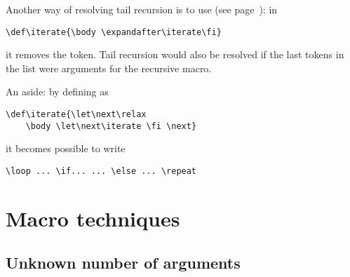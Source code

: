 Another way of resolving tail recursion is to use
 (see page~\pageref{after:cond}): in
\begin{verbatim}
\def\iterate{\body \expandafter\iterate\fi}
\end{verbatim}
it removes the  token.
Tail recursion would also be resolved if the last
tokens in the list were arguments for the
recursive macro.

An aside: by defining  as
\begin{verbatim}
\def\iterate{\let\next\relax 
    \body \let\next\iterate \fi \next}
\end{verbatim}
it becomes possible to write
\begin{verbatim}
\loop ... \if... ... \else ... \repeat
\end{verbatim}

\section{Macro techniques}

\subsection{Unknown number of arguments}

